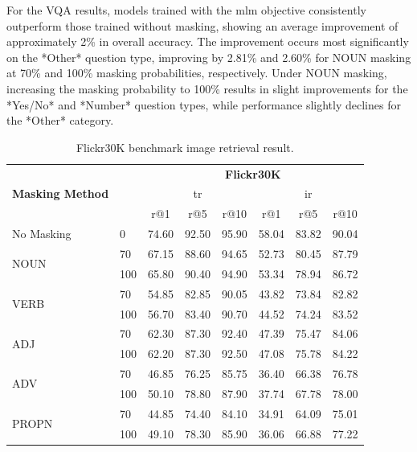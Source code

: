 For the VQA results, models trained with the \acrshort{mlm} objective consistently outperform those trained without masking, showing an average improvement of approximately 2\% in overall accuracy.
The improvement occurs most significantly on the *Other* question type, improving by 2.81\% and 2.60\% for NOUN masking at 70\% and 100\% masking probabilities, respectively.
Under NOUN masking, increasing the masking probability to 100\% results in slight improvements for the *Yes/No* and *Number* question types, while performance slightly declines for the *Other* category.

\begin{table}[h]
    \centering
    \caption{Flickr30K benchmark image retrieval result.}
    \label{tab:flickr30k-prob}
    \begin{adjustbox}{width=0.8\textwidth}
        \begin{tabular}{ll|l|ccc|ccc}
            \hline
            \multicolumn{2}{c|}{\multirow{3}{*}{\textbf{Masking Method}}} & {\multirow{3}{*}{\textbf{Masking probability}}} & \multicolumn{6}{c}{\textbf{Flickr30K}} \\
            & & & \multicolumn{3}{c|}{\acrshort{tr}} & \multicolumn{3}{c}{\acrshort{ir}} \\
            & & & r@1 & r@5 & r@10 & r@1 & r@5 & r@10 \\
            \hline
            \multicolumn{2}{l|}{No Masking} & 0 & 74.60 & 92.50 & 95.90 & 58.04 & 83.82 & 90.04 \\
            \hline
            \multicolumn{2}{l|}{\multirow{2}{*}{NOUN}} & 70 & 67.15 & 88.60 & 94.65 & 52.73 & 80.45 & 87.79 \\
            & & 100 & 65.80 & 90.40 & 94.90 & 53.34 & 78.94 & 86.72 \\
            \hline
            \multicolumn{2}{l|}{\multirow{2}{*}{VERB}} & 70 & 54.85 & 82.85 & 90.05 & 43.82 & 73.84 & 82.82 \\
            & & 100 & 56.70 & 83.40 & 90.70 & 44.52 & 74.24 & 83.52 \\
            \hline
            \multicolumn{2}{l|}{\multirow{2}{*}{ADJ}} & 70 & 62.30 & 87.30 & 92.40 & 47.39 & 75.47 & 84.06 \\
            & & 100 & 62.20 & 87.30 & 92.50 & 47.08 & 75.78 & 84.22 \\
            \hline
            \multicolumn{2}{l|}{\multirow{2}{*}{ADV}} & 70 & 46.85 & 76.25 & 85.75 & 36.40 & 66.38 & 76.78 \\
            & & 100 & 50.10 & 78.80 & 87.90 & 37.74 & 67.78 & 78.00 \\
            \hline
            \multicolumn{2}{l|}{\multirow{2}{*}{PROPN}} & 70 & 44.85 & 74.40 & 84.10 & 34.91 & 64.09 & 75.01 \\
            & & 100 & 49.10 & 78.30 & 85.90 & 36.06 & 66.88 & 77.22 \\
            \hline
        \end{tabular}
    \end{adjustbox}
\end{table}

